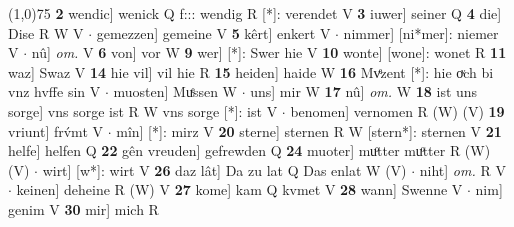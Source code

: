 \documentclass[8pt,a4paper,notitlepage]{article}
\begin{document}
\begin{table}[ht]
\begin{minipage}[t]{0.5\linewidth}
\line(1,0){75} \newline
\textbf{2} wendic] wenick Q f::: wendig R [*]: verendet V \textbf{3} iuwer] seiner Q \textbf{4} die] Dise R W V  $\cdot$ gemezzen] gemeine V \textbf{5} kêrt] enkert V  $\cdot$ nimmer] [ni*mer]: niemer V  $\cdot$ nû] \textit{om.} V \textbf{6} von] vor W \textbf{9} wer] [*]: Swer hie V \textbf{10} wonte] [wone]: wonet R \textbf{11} waz] Swaz V \textbf{14} hie vil] vil hie R \textbf{15} heiden] haide W \textbf{16} Mvͤzent [*]: hie oͮch bi vnz hvffe sin V  $\cdot$ muosten] Muͤssen W  $\cdot$ uns] mir W \textbf{17} nû] \textit{om.} W \textbf{18} ist uns sorge] vns sorge ist R W vns sorge [*]: ist V  $\cdot$ benomen] vernomen R (W) (V) \textbf{19} vriunt] frv́mt V  $\cdot$ mîn] [*]: mirz V \textbf{20} sterne] sternen R W [stern*]: sternen V \textbf{21} helfe] helfen Q \textbf{22} gên vreuden] gefrewden Q \textbf{24} muoter] muͦtter muͦtter R (W) (V)  $\cdot$ wirt] [w*]: wirt V \textbf{26} daz lât] Da zu lat Q Das enlat W (V)  $\cdot$ niht] \textit{om.} R V  $\cdot$ keinen] deheine R (W) V \textbf{27} kome] kam Q kvmet V \textbf{28} wann] Swenne V  $\cdot$ nim] genim V \textbf{30} mir] mich R \newline
\end{minipage}
\end{table}
\end{document}
